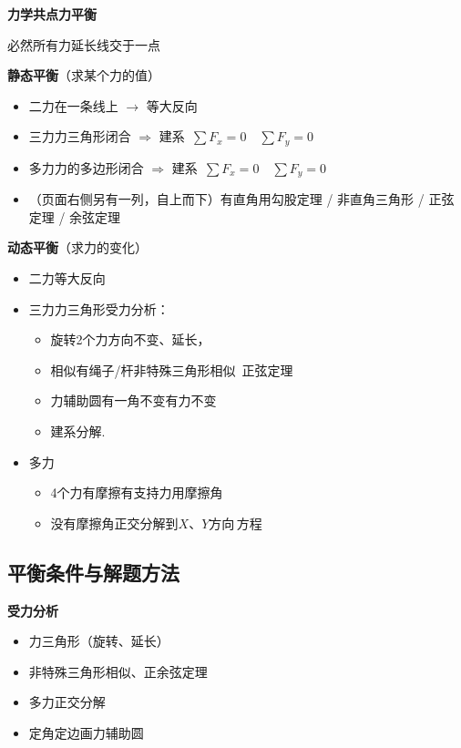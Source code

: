 \textbf{力学\quad 共点力平衡}

必然\quad 所有力延长线交于一点

\medskip
\textbf{静态平衡}\quad （求某个力的值）
\begin{itemize}
\item 二力\quad 在一条线上 $\to$ 等大反向
\item 三力\quad 力三角形闭合 $\Rightarrow$ 建系\ $\sum F_x=0$\ \ $\sum F_y=0$
\item 多力\quad 力的多边形闭合 $\Rightarrow$ 建系\ $\sum F_x=0$\ \ $\sum F_y=0$
\item （页面右侧另有一列，自上而下）有直角用勾股定理 / 非直角三角形 / 正弦定理 / 余弦定理
\end{itemize}

\medskip
\textbf{动态平衡}\quad （求力的变化）
\begin{itemize}
\item 二力\quad 等大反向
\item 三力\quad 力三角形\quad 受力分析：
  \begin{itemize}
  \item 旋转\quad 2个力方向不变\quad 、延长，
  \item 相似\quad 有绳子/杆\quad 非特殊三角形\quad 相似\ 正弦定理
  \item 力辅助圆\quad 有一角不变\quad 有力不变
  \item 建系分解.
  \end{itemize}
\item 多力 %
  \begin{itemize}
  \item 4个力\quad 有摩擦\quad 有支持力\quad 用摩擦角
  \item 没有摩擦角\quad 正交分解到$X$、$Y$方向\,方程
  \end{itemize}
\end{itemize}

\subsection{平衡条件与解题方法}
\textbf{受力分析}
\begin{itemize}
\item 力三角形（旋转、延长）
\item 非特殊三角形\quad 相似、正余弦定理
\item 多力正交分解
\item 定角定边画力辅助圆
\end{itemize}

